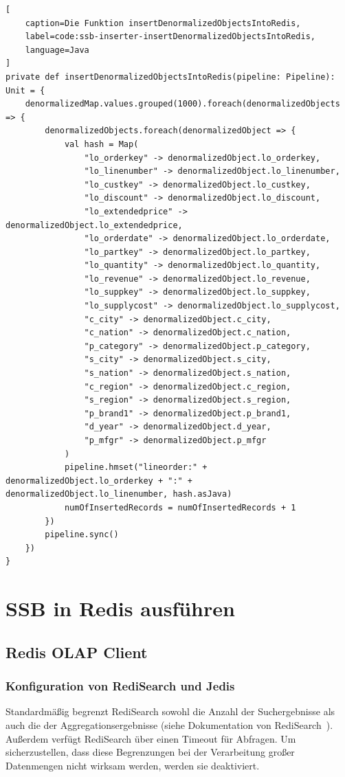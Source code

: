 \begin{lstlisting}[
    caption=Die Funktion insertDenormalizedObjectsIntoRedis,
    label=code:ssb-inserter-insertDenormalizedObjectsIntoRedis,
    language=Java
]
private def insertDenormalizedObjectsIntoRedis(pipeline: Pipeline): Unit = {
	denormalizedMap.values.grouped(1000).foreach(denormalizedObjects => {
		denormalizedObjects.foreach(denormalizedObject => {
			val hash = Map(
				"lo_orderkey" -> denormalizedObject.lo_orderkey,
				"lo_linenumber" -> denormalizedObject.lo_linenumber,
				"lo_custkey" -> denormalizedObject.lo_custkey,
				"lo_discount" -> denormalizedObject.lo_discount,
				"lo_extendedprice" -> denormalizedObject.lo_extendedprice,
				"lo_orderdate" -> denormalizedObject.lo_orderdate,
				"lo_partkey" -> denormalizedObject.lo_partkey,
				"lo_quantity" -> denormalizedObject.lo_quantity,
				"lo_revenue" -> denormalizedObject.lo_revenue,
				"lo_suppkey" -> denormalizedObject.lo_suppkey,
				"lo_supplycost" -> denormalizedObject.lo_supplycost,
				"c_city" -> denormalizedObject.c_city,
				"c_nation" -> denormalizedObject.c_nation,
				"p_category" -> denormalizedObject.p_category,
				"s_city" -> denormalizedObject.s_city,
				"s_nation" -> denormalizedObject.s_nation,
				"c_region" -> denormalizedObject.c_region,
				"s_region" -> denormalizedObject.s_region,
				"p_brand1" -> denormalizedObject.p_brand1,
				"d_year" -> denormalizedObject.d_year,
				"p_mfgr" -> denormalizedObject.p_mfgr
			)
			pipeline.hmset("lineorder:" + denormalizedObject.lo_orderkey + ":" + denormalizedObject.lo_linenumber, hash.asJava)
			numOfInsertedRecords = numOfInsertedRecords + 1
		})
		pipeline.sync()
	})
}
\end{lstlisting}




\section{SSB in Redis ausführen}\label{sec:ssb-use-in-redis}

\subsection{Redis OLAP Client}

\subsubsection{Konfiguration von RediSearch und Jedis}
Standardmäßig begrenzt RediSearch sowohl die Anzahl der Suchergebnisse als auch die der Aggregationsergebnisse (siehe Dokumentation von RediSearch~\cite{redis_ltd_configuration_nodate}). Außerdem verfügt RediSearch über einen Timeout für Abfragen. Um sicherzustellen, dass diese Begrenzungen bei der Verarbeitung großer Datenmengen nicht wirksam werden, werden sie deaktiviert.

